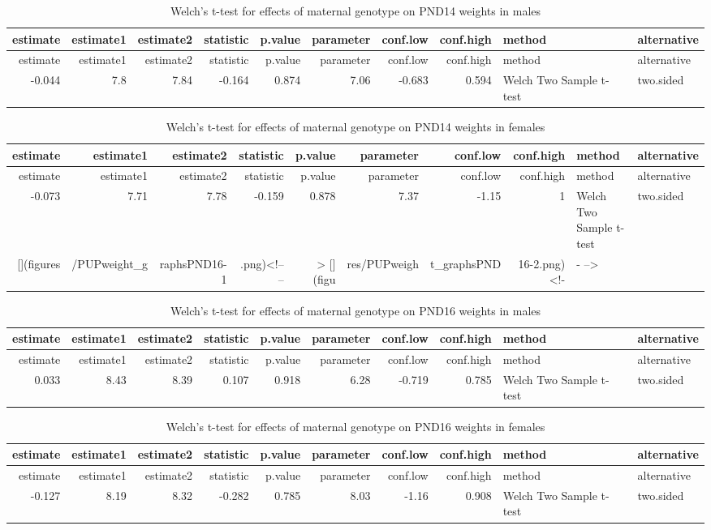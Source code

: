 \documentclass[]{article}
\begin{document}
\begin{longtable}[]{@{}rrrrrrrrll@{}}
\caption{Welch's t-test for effects of maternal genotype on PND14
weights in males}\tabularnewline
\toprule
estimate & estimate1 & estimate2 & statistic & p.value & parameter &
conf.low & conf.high & method & alternative\tabularnewline
\midrule
\endfirsthead
\toprule
estimate & estimate1 & estimate2 & statistic & p.value & parameter &
conf.low & conf.high & method & alternative\tabularnewline
\midrule
\endhead
-0.044 & 7.8 & 7.84 & -0.164 & 0.874 & 7.06 & -0.683 & 0.594 & Welch Two
Sample t-test & two.sided\tabularnewline
\bottomrule
\end{longtable}

\begin{longtable}[]{@{}rrrrrrrrll@{}}
\caption{Welch's t-test for effects of maternal genotype on PND14
weights in females}\tabularnewline
\toprule
estimate & estimate1 & estimate2 & statistic & p.value & parameter &
conf.low & conf.high & method & alternative\tabularnewline
\midrule
\endfirsthead
\toprule
estimate & estimate1 & estimate2 & statistic & p.value & parameter &
conf.low & conf.high & method & alternative\tabularnewline
\midrule
\endhead
-0.073 & 7.71 & 7.78 & -0.159 & 0.878 & 7.37 & -1.15 & 1 & Welch Two
Sample t-test & two.sided\tabularnewline
{[}{]}(figures & /PUPweight\_g & raphsPND16-1 & .png)\textless{}!-- -- &
\textgreater{} {[}{]}(figu & res/PUPweigh & t\_graphsPND &
16-2.png)\textless{}!- & - --\textgreater{} &\tabularnewline
\bottomrule
\end{longtable}

\begin{longtable}[]{@{}rrrrrrrrll@{}}
\caption{Welch's t-test for effects of maternal genotype on PND16
weights in males}\tabularnewline
\toprule
estimate & estimate1 & estimate2 & statistic & p.value & parameter &
conf.low & conf.high & method & alternative\tabularnewline
\midrule
\endfirsthead
\toprule
estimate & estimate1 & estimate2 & statistic & p.value & parameter &
conf.low & conf.high & method & alternative\tabularnewline
\midrule
\endhead
0.033 & 8.43 & 8.39 & 0.107 & 0.918 & 6.28 & -0.719 & 0.785 & Welch Two
Sample t-test & two.sided\tabularnewline
\bottomrule
\end{longtable}

\begin{longtable}[]{@{}rrrrrrrrll@{}}
\caption{Welch's t-test for effects of maternal genotype on PND16
weights in females}\tabularnewline
\toprule
estimate & estimate1 & estimate2 & statistic & p.value & parameter &
conf.low & conf.high & method & alternative\tabularnewline
\midrule
\endfirsthead
\toprule
estimate & estimate1 & estimate2 & statistic & p.value & parameter &
conf.low & conf.high & method & alternative\tabularnewline
\midrule
\endhead
-0.127 & 8.19 & 8.32 & -0.282 & 0.785 & 8.03 & -1.16 & 0.908 & Welch Two
Sample t-test & two.sided\tabularnewline
\bottomrule
\end{longtable}
\end{document}
